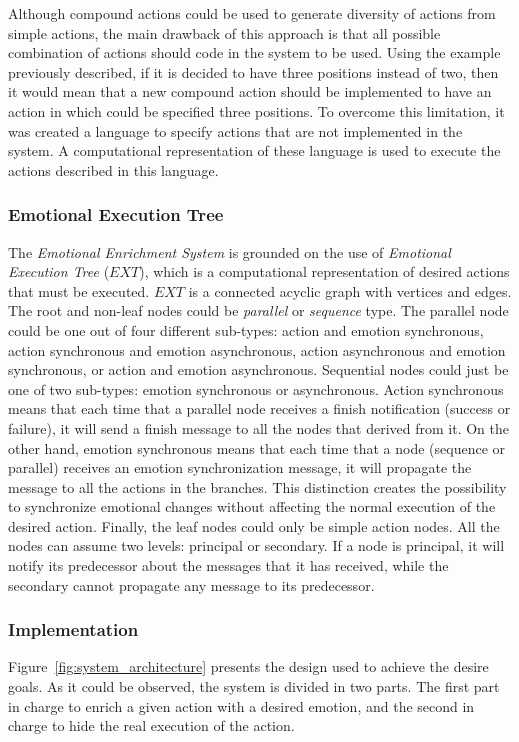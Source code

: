 Although compound actions could be used to generate diversity of actions from simple actions, the main drawback of this approach is that all possible combination of actions should code in the system to be used. Using the example previously described, if it is decided to have three positions instead of two, then it would mean that a new compound action should be implemented to have an action in which could be specified three positions. To overcome this limitation, it was created a language to specify actions that are not implemented in the system. A computational representation of these language is used to execute the actions described in this language. 

\subsubsection{Emotional Execution Tree}
The \textit{Emotional Enrichment System}  is grounded on the use of \textit{Emotional Execution Tree} ($EXT$), which is a computational representation of desired actions that must be executed. 
$EXT$ is a connected acyclic graph with vertices and  edges. The root and non-leaf nodes could be \textit{parallel} or \textit{sequence} type. The parallel node could be one out of four different sub-types: action and emotion synchronous, action synchronous and emotion asynchronous, action asynchronous and emotion synchronous, or action and emotion asynchronous. Sequential nodes could just be one of two sub-types: emotion synchronous or asynchronous. Action synchronous means that each time that a parallel node receives a finish notification (success or failure), it will send a finish message to all the nodes that derived from it. On the other hand, emotion synchronous means that each time that a node (sequence or parallel) receives an emotion synchronization message, it will propagate the message to all the actions in the branches. 
This distinction creates the possibility to synchronize emotional changes without affecting the normal execution of the desired action. Finally, the leaf nodes could only be simple action nodes. All the nodes can assume two levels: principal or secondary. If a node is principal, it will notify its predecessor about the messages that it has received, while the secondary cannot propagate any message to its predecessor.

\subsubsection{Implementation}
Figure~\ref{fig:system_architecture} presents the design used to achieve the desire goals. As it could be observed, the system is divided in two parts. The first part in charge to enrich a given action with a desired emotion, and the second in charge to hide the real execution of the action. 

